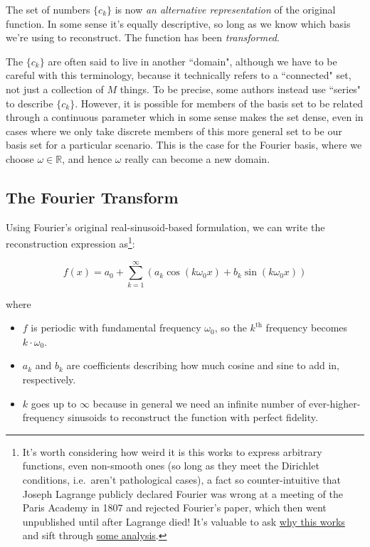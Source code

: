 \documentclass[10pt]{article}
\begin{document}
\noindent The set of numbers $\{c_k\}$ is now \textit{an alternative representation} of the original function. In some sense it's equally descriptive, so long as we know which basis we're using to reconstruct. The function has been \textit{transformed}.

The $\{c_k\}$ are often said to live in another ``domain", although we have to be careful with this terminology, because it technically refers to a ``connected" set, not just a collection of $M$ things. To be precise, some authors instead use ``series" to describe $\{c_k\}$. However, it is possible for members of the basis set to be related through a continuous parameter which in some sense makes the set dense, even in cases where we only take discrete members of this more general set to be our basis set for a particular scenario. This is the case for the Fourier basis, where we choose $\omega \in \mathbb{R}$, and hence $\omega$ really can become a new domain.

\subsection{The Fourier Transform}\label{fourierT}

Using Fourier's original real-sinusoid-based formulation, we can write the reconstruction expression as\footnote{It's worth considering how weird it is this works to express arbitrary functions, even non-smooth ones (so long as they meet the Dirichlet conditions\cite{oppenheim}, i.e.~aren't pathological cases), a fact so counter-intuitive that Joseph Lagrange publicly declared Fourier was wrong at a meeting of the Paris Academy in 1807\cite{michigan} and rejected Fourier's paper, which then went unpublished until after Lagrange died!\cite{oppenheim} It's valuable to ask \href{https://math.stackexchange.com/questions/1105265/why-do-fourier-series-work}{why this works}\cite{why} and sift through \href{https://math.uchicago.edu/~may/REU2017/REUPapers/Xue.pdf}{some analysis}\cite{chicago}.}:

$$ f(x) = a_0 + \sum_{k=1}^{\infty} (a_k \cos(k \omega_0 x) + b_k \sin(k \omega_0 x))$$

where
\begin{itemize}[noitemsep, topsep=0pt, after=\newline]
	\item $f$ is periodic with fundamental frequency $\omega_0$, so the $k^\text{th}$ frequency becomes $k \cdot \omega_0$.
	\item $a_k$ and $b_k$ are coefficients describing how much cosine and sine to add in, respectively.
	\item $k$ goes up to $\infty$ because in general we need an infinite number of ever-higher-frequency sinusoids to reconstruct the function with perfect fidelity.
\end{itemize}
\end{document}
